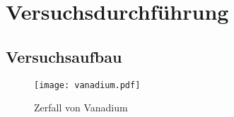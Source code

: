 \section{Versuchsdurchführung}
\label{sec:durchfuehrung}
\subsection{Versuchsaufbau}
\label{sec:aufbau}

\begin{figure}
  \centering
  \texttt{[image: vanadium.pdf]} %
  \caption{Zerfall von Vanadium} %
  \label{fig:vanadium}
\end{figure}